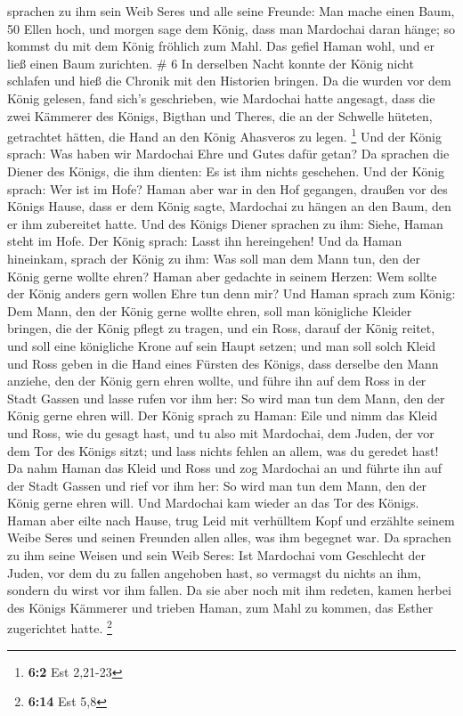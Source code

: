 sprachen zu ihm sein Weib Seres und alle seine Freunde: Man mache einen
Baum, 50 Ellen hoch, und morgen sage dem König, dass man Mardochai daran
hänge; so kommst du mit dem König fröhlich zum Mahl. Das gefiel Haman
wohl, und er ließ einen Baum zurichten. \# 6  In derselben
Nacht konnte der König nicht schlafen und hieß die Chronik mit den
Historien bringen. Da die wurden vor dem König gelesen, 
fand sich's geschrieben, wie Mardochai hatte angesagt, dass die zwei
Kämmerer des Königs, Bigthan und Theres, die an der Schwelle hüteten,
getrachtet hätten, die Hand an den König Ahasveros zu legen. \footnote{\textbf{6:2}
  Est 2,21-23}  Und der König sprach: Was haben wir
Mardochai Ehre und Gutes dafür getan? Da sprachen die Diener des Königs,
die ihm dienten: Es ist ihm nichts geschehen.  Und der
König sprach: Wer ist im Hofe? Haman aber war in den Hof gegangen,
draußen vor des Königs Hause, dass er dem König sagte, Mardochai zu
hängen an den Baum, den er ihm zubereitet hatte.  Und des
Königs Diener sprachen zu ihm: Siehe, Haman steht im Hofe. Der König
sprach: Lasst ihn hereingehen!  Und da Haman hineinkam,
sprach der König zu ihm: Was soll man dem Mann tun, den der König gerne
wollte ehren? Haman aber gedachte in seinem Herzen: Wem sollte der König
anders gern wollen Ehre tun denn mir?  Und Haman sprach
zum König: Dem Mann, den der König gerne wollte ehren, 
soll man königliche Kleider bringen, die der König pflegt zu tragen, und
ein Ross, darauf der König reitet, und soll eine königliche Krone auf
sein Haupt setzen;  und man soll solch Kleid und Ross
geben in die Hand eines Fürsten des Königs, dass derselbe den Mann
anziehe, den der König gern ehren wollte, und führe ihn auf dem Ross in
der Stadt Gassen und lasse rufen vor ihm her: So wird man tun dem Mann,
den der König gerne ehren will.  Der König sprach zu
Haman: Eile und nimm das Kleid und Ross, wie du gesagt hast, und tu also
mit Mardochai, dem Juden, der vor dem Tor des Königs sitzt; und lass
nichts fehlen an allem, was du geredet hast!  Da nahm
Haman das Kleid und Ross und zog Mardochai an und führte ihn auf der
Stadt Gassen und rief vor ihm her: So wird man tun dem Mann, den der
König gerne ehren will.  Und Mardochai kam wieder an das
Tor des Königs. Haman aber eilte nach Hause, trug Leid mit verhülltem
Kopf  und erzählte seinem Weibe Seres und seinen Freunden
allen alles, was ihm begegnet war. Da sprachen zu ihm seine Weisen und
sein Weib Seres: Ist Mardochai vom Geschlecht der Juden, vor dem du zu
fallen angehoben hast, so vermagst du nichts an ihm, sondern du wirst
vor ihm fallen.  Da sie aber noch mit ihm redeten, kamen
herbei des Königs Kämmerer und trieben Haman, zum Mahl zu kommen, das
Esther zugerichtet hatte. \footnote{\textbf{6:14} Est 5,8}

